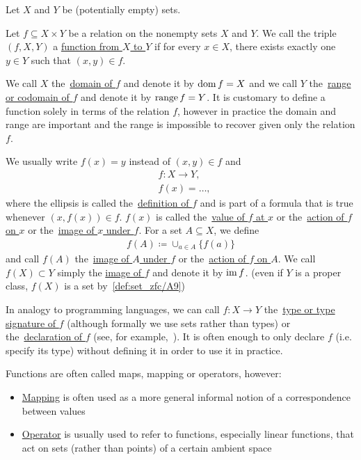 \begin{definition}\label{def:function}
  Let $X$ and $Y$ be (potentially empty) sets.

  Let $f \subseteq X \times Y$ be a relation on the nonempty sets $X$ and $Y$. We call the triple $(f, X, Y)$ a \ul{function from $X$ to $Y$} if for every $x \in X$, there exists exactly one $y \in Y$ such that $(x, y) \in f$.

  We call $X$ the~\ul{domain of $f$} and denote it by $\operatorname{dom} f = X$ and we call $Y$ the~\ul{range or codomain of $f$} and denote it by $\operatorname{range} f = Y$. It is customary to define a function solely in terms of the relation $f$, however in practice the domain and range are important and the range is impossible to recover given only the relation $f$.

  We usually write $f(x) = y$ instead of $(x, y) \in f$ and
  \begin{align*}
    &f: X \to Y, \\
    &f(x) = \ldots,
  \end{align*}
  where the ellipsis is called the~\ul{definition of $f$} and is part of a formula that is true whenever $(x, f(x)) \in f$. $f(x)$ is called the~\ul{value of $f$ at $x$} or the~\ul{action of $f$ on $x$} or the~\ul{image of $x$ under $f$}. For a set $A \subseteq X$, we define
  \begin{align*}
    f(A) \coloneqq \cup_{a \in A} \{ f(a) \}
  \end{align*}
  and call $f(A)$ the~\ul{image of $A$ under $f$} or the~\ul{action of $f$ on $A$}. We call $f(X) \subset Y$ simply the \ul{image of $f$} and denote it by $\operatorname{im} f$. (even if $Y$ is a proper class, $f(X)$ is a set by~\cref{def:set_zfc/A9})

  In analogy to programming languages, we can call $f: X \to Y$ the~\ul{type or type signature of $f$} (although formally we use sets rather than types) or the~\ul{declaration of $f$} (see, for example,~\cite[section 2.4]{Kernighan1988}). It is often enough to only declare $f$ (i.e. specify its type) without defining it in order to use it in practice.

  Functions are often called maps, mapping or operators, however:
  \begin{itemize}
    \item \ul{Mapping} is often used as a more general informal notion of a correspondence between values
    \item \ul{Operator} is usually used to refer to functions, especially linear functions, that act on sets (rather than points) of a certain ambient space
  \end{itemize}


\end{definition}
